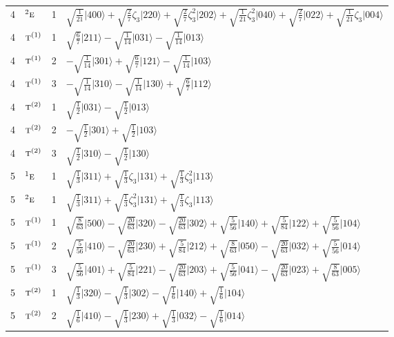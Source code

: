 \documentclass[11pt]{article}
\newcommand{\irr}[1]{\text{\normalfont\scshape #1}}
\newcommand{\conjpair}[1]{{}^{#1}}
\newcommand{\rootunity}[1]{\zeta_{#1}}
\newcommand{\occ}[1]{\lvert #1\rangle}
\begin{document}
\begin{longtable}{c l c p{}}
4 & $\conjpair{2}\irr{e}$ & 1 & $\sqrt{\tfrac{1}{21}}\occ{400}+\sqrt{\tfrac{2}{7}}\rootunity{3}\occ{220}+\sqrt{\tfrac{2}{7}}\rootunity{3}^{2}\occ{202}+\sqrt{\tfrac{1}{21}}\rootunity{3}^{2}\occ{040}+\sqrt{\tfrac{2}{7}}\occ{022}+\sqrt{\tfrac{1}{21}}\rootunity{3}\occ{004}$\\
4 & $\irr{t}^{(1)}$ & 1 & $\sqrt{\tfrac{6}{7}}\occ{211}-\sqrt{\tfrac{1}{14}}\occ{031}-\sqrt{\tfrac{1}{14}}\occ{013}$\\
4 & $\irr{t}^{(1)}$ & 2 & $-\sqrt{\tfrac{1}{14}}\occ{301}+\sqrt{\tfrac{6}{7}}\occ{121}-\sqrt{\tfrac{1}{14}}\occ{103}$\\
4 & $\irr{t}^{(1)}$ & 3 & $-\sqrt{\tfrac{1}{14}}\occ{310}-\sqrt{\tfrac{1}{14}}\occ{130}+\sqrt{\tfrac{6}{7}}\occ{112}$\\
4 & $\irr{t}^{(2)}$ & 1 & $\sqrt{\tfrac{1}{2}}\occ{031}-\sqrt{\tfrac{1}{2}}\occ{013}$\\
4 & $\irr{t}^{(2)}$ & 2 & $-\sqrt{\tfrac{1}{2}}\occ{301}+\sqrt{\tfrac{1}{2}}\occ{103}$\\
4 & $\irr{t}^{(2)}$ & 3 & $\sqrt{\tfrac{1}{2}}\occ{310}-\sqrt{\tfrac{1}{2}}\occ{130}$\\
\hline
5 & $\conjpair{1}\irr{e}$ & 1 & $\sqrt{\tfrac{1}{3}}\occ{311}+\sqrt{\tfrac{1}{3}}\rootunity{3}\occ{131}+\sqrt{\tfrac{1}{3}}\rootunity{3}^{2}\occ{113}$\\
5 & $\conjpair{2}\irr{e}$ & 1 & $\sqrt{\tfrac{1}{3}}\occ{311}+\sqrt{\tfrac{1}{3}}\rootunity{3}^{2}\occ{131}+\sqrt{\tfrac{1}{3}}\rootunity{3}\occ{113}$\\
5 & $\irr{t}^{(1)}$ & 1 & $\sqrt{\tfrac{8}{63}}\occ{500}-\sqrt{\tfrac{20}{63}}\occ{320}-\sqrt{\tfrac{20}{63}}\occ{302}+\sqrt{\tfrac{5}{56}}\occ{140}+\sqrt{\tfrac{5}{84}}\occ{122}+\sqrt{\tfrac{5}{56}}\occ{104}$\\
5 & $\irr{t}^{(1)}$ & 2 & $\sqrt{\tfrac{5}{56}}\occ{410}-\sqrt{\tfrac{20}{63}}\occ{230}+\sqrt{\tfrac{5}{84}}\occ{212}+\sqrt{\tfrac{8}{63}}\occ{050}-\sqrt{\tfrac{20}{63}}\occ{032}+\sqrt{\tfrac{5}{56}}\occ{014}$\\
5 & $\irr{t}^{(1)}$ & 3 & $\sqrt{\tfrac{5}{56}}\occ{401}+\sqrt{\tfrac{5}{84}}\occ{221}-\sqrt{\tfrac{20}{63}}\occ{203}+\sqrt{\tfrac{5}{56}}\occ{041}-\sqrt{\tfrac{20}{63}}\occ{023}+\sqrt{\tfrac{8}{63}}\occ{005}$\\
5 & $\irr{t}^{(2)}$ & 1 & $\sqrt{\tfrac{1}{3}}\occ{320}-\sqrt{\tfrac{1}{3}}\occ{302}-\sqrt{\tfrac{1}{6}}\occ{140}+\sqrt{\tfrac{1}{6}}\occ{104}$\\
5 & $\irr{t}^{(2)}$ & 2 & $\sqrt{\tfrac{1}{6}}\occ{410}-\sqrt{\tfrac{1}{3}}\occ{230}+\sqrt{\tfrac{1}{3}}\occ{032}-\sqrt{\tfrac{1}{6}}\occ{014}$\\

\end{longtable}
\end{document}
